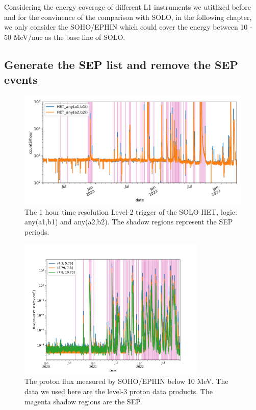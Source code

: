 Considering the energy coverage of different L1 instruments we utitlized before and for the convinence of the comparison with SOLO, in the following chapter, we only consider the SOHO/EPHIN which could cover the energy between 10 - 50 MeV/nuc as the base line of SOLO.


\subsection{Generate the SEP list and remove the SEP events}

\begin{figure}
    \centering
    \includegraphics[width = \textwidth]{images/ACR/SOLO-lvl2-trriger.png}
    \caption{The 1 hour time resolution Level-2 trigger of the SOLO HET, logic: any(a1,b1) and any(a2,b2). The shadow regions represent the SEP periods.}
    \label{Fig:solo-lvl2}
\end{figure}



\begin{figure}
    \centering
    \includegraphics[width = 0.8\textwidth]{images/ACR/SOLO-EPHIN-l3i-log2+6-proton-6H.png}
    \caption{The proton flux measured by SOHO/EPHIN below 10 MeV. The data we used here are the level-3 proton data products. The magenta shadow regions are the SEP.}
    \label{Fig:SOHO_EPHIN_Proton_flux}
\end{figure}

